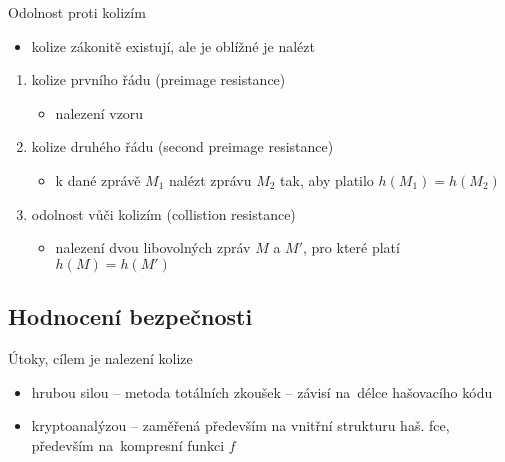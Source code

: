Odolnost proti kolizím
\begin{itemize}
    \item kolize zákonitě existují, ale je oblížné je nalézt
\end{itemize}
\begin{enumerate}
    \item kolize prvního řádu (preimage resistance)
    \begin{itemize}
        \item nalezení vzoru
    \end{itemize}
    \item kolize druhého řádu (second preimage resistance)
    \begin{itemize}
        \item k dané zprávě $M_{1}$ nalézt zprávu $M_{2}$ tak, aby platilo $h(M_{1}) = h(M_{2})$
    \end{itemize}
    \item odolnost vůči kolizím (collistion resistance)
    \begin{itemize}
        \item nalezení dvou libovolných zpráv $M$ a $M'$, pro které platí $h(M) = h(M')$
    \end{itemize}
\end{enumerate}

\subsection{Hodnocení bezpečnosti}
Útoky, cílem je nalezení kolize
\begin{itemize}
    \item hrubou silou -- metoda totálních zkoušek -- závisí na~délce hašovacího kódu
    \item kryptoanalýzou -- zaměřená především na vnitřní strukturu haš. fce, především na~kompresní funkci $f$
\end{itemize}

